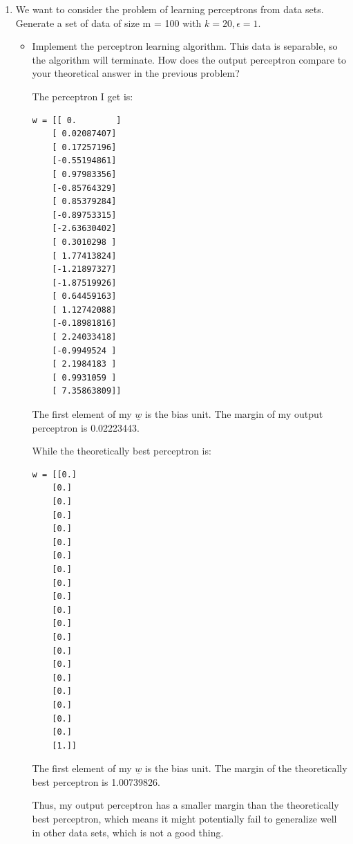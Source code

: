 \documentclass[letter, 12pt]{article}
\begin{document}
\begin{enumerate}
        \item {We want to consider the problem of learning perceptrons from data sets. Generate a set of data of size m = 100
            with $ k = 20, \epsilon = 1 $.}
        \begin{itemize}
            \item {Implement the perceptron learning algorithm. This data is separable, so the algorithm will terminate. How does the output perceptron compare to your theoretical answer in the previous problem?}
            \par{The perceptron I get is: }
            \begin{lstlisting}
w = [[ 0.        ]
    [ 0.02087407]
    [ 0.17257196]
    [-0.55194861]
    [ 0.97983356]
    [-0.85764329]
    [ 0.85379284]
    [-0.89753315]
    [-2.63630402]
    [ 0.3010298 ]
    [ 1.77413824]
    [-1.21897327]
    [-1.87519926]
    [ 0.64459163]
    [ 1.12742088]
    [-0.18981816]
    [ 2.24033418]
    [-0.9949524 ]
    [ 2.1984183 ]
    [ 0.9931059 ]
    [ 7.35863809]]
            \end{lstlisting}
            \par{The first element of my $ \underline{w} $ is the bias unit. The margin of my output perceptron is 0.02223443.}
            \par{While the theoretically best perceptron is:}
            \begin{lstlisting}
w = [[0.]
    [0.]
    [0.]
    [0.]
    [0.]
    [0.]
    [0.]
    [0.]
    [0.]
    [0.]
    [0.]
    [0.]
    [0.]
    [0.]
    [0.]
    [0.]
    [0.]
    [0.]
    [0.]
    [0.]
    [1.]]
            \end{lstlisting}
            \par{The first element of my $ \underline{w} $ is the bias unit. The margin of the theoretically best perceptron is 1.00739826.}
            \par{Thus, my output perceptron has a smaller margin than the theoretically best perceptron, which means it might potentially fail to generalize well in other data sets, which is not a good thing.}
        \end{itemize}
        

\end{enumerate}
\end{document}

